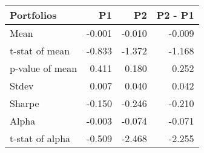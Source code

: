 \begin{tabular}{lrrr}
\toprule
Portfolios & P1 & P2 & P2 - P1 \\
\midrule
Mean & -0.001 & -0.010 & -0.009 \\
t-stat of mean & -0.833 & -1.372 & -1.168 \\
p-value of mean & 0.411 & 0.180 & 0.252 \\
Stdev & 0.007 & 0.040 & 0.042 \\
Sharpe & -0.150 & -0.246 & -0.210 \\
Alpha & -0.003 & -0.074 & -0.071 \\
t-stat of alpha & -0.509 & -2.468 & -2.255 \\
\bottomrule
\end{tabular}
